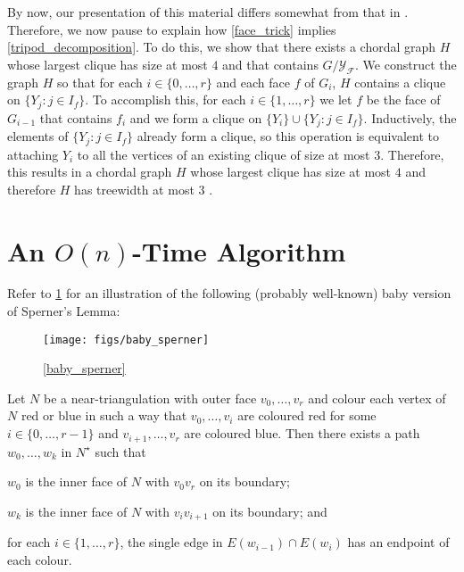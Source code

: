 \documentclass{patmorin}
\begin{document}
By now, our presentation of this material differs somewhat from that in \cite{dujmovic.joret.ea:planar,ueckerdt.wood.ea:improved}.  Therefore, we now pause to explain how \cref{face_trick} implies \cref{tripod_decomposition}.  To do this, we show that there exists a chordal graph $H$ whose largest clique has size at most $4$ and that contains $G/\mathcal{Y_F}$. We construct the graph $H$ so that for each $i\in\{0,\ldots,r\}$ and each face $f$ of $G_i$, $H$ contains a clique on $\{Y_j:j\in I_f\}$. To accomplish this, for each $i\in\{1,\ldots,r\}$ we let $f$ be the face of $G_{i-1}$ that contains $f_i$ and we form a clique on $\{Y_i\}\cup\{Y_j:j\in I_f\}$.  Inductively, the elements of $\{Y_j:j\in I_f\}$ already form a clique, so this operation is equivalent to attaching $Y_i$ to all the vertices of an existing clique of size at most $3$. Therefore, this results in a chordal graph $H$ whose largest clique has size at most $4$ and therefore $H$ has treewidth at most $3$ \cite{gavril:intersection}.

\section{An $O(n)$-Time Algorithm}
\label{linear_time_algorithm}\label{algorithm}

Refer to \cref{baby_sperner_fig} for an illustration of the following (probably well-known) baby version of Sperner's Lemma:

\begin{figure}
  \begin{center}
    \texttt{[image: figs/baby\_sperner]}
  \end{center}
  \caption{\cref{baby_sperner}}
  \label{baby_sperner_fig}
\end{figure}

\begin{lem}\label{baby_sperner}
  Let $N$ be a near-triangulation with outer face $v_0,\ldots,v_r$ and colour each vertex of $N$ red or blue in such a way that $v_0,\ldots,v_i$ are coloured red for some $i\in\{0,\ldots,r-1\}$ and $v_{i+1},\ldots,v_r$ are coloured blue.  Then there exists a path $w_0,\ldots,w_k$ in $N^\star$ such that
  \begin{compactenum}
    \item $w_0$ is the inner face of $N$ with $v_0v_r$ on its boundary;
    \item $w_k$ is the inner face of $N$ with $v_iv_{i+1}$ on its boundary; and
    \item for each $i\in\{1,\ldots,r\}$, the single edge in $E(w_{i-1})\cap E(w_i)$ has an endpoint of each colour.
  \end{compactenum}
\end{lem}
\end{document}
